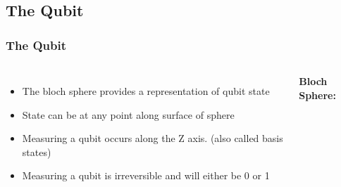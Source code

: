 \documentclass[aspectratio=169,11pt,hyperref={colorlinks=true}]{beamer}
\begin{document}
\subsection{The Qubit}
\begin{frame}
    \frametitle{The Qubit}
    \begin{columns}
            \begin{itemize}
                \item The bloch sphere provides a representation of qubit state
                \item State can be at any point along surface of sphere
                \item Measuring a qubit occurs along the Z axis. (also called basis states)
                \item Measuring a qubit is irreversible and will either be 0
                      or 1
            \end{itemize}
            \begin{center}
                \textbf{Bloch Sphere:}

\end{center}
\end{columns}
\end{frame}
\end{document}
